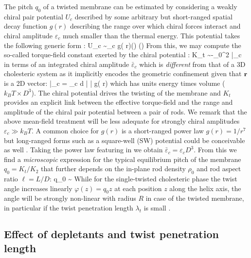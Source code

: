 The pitch $q_{0}$ of a twisted membrane can be estimated by considering a weakly chiral pair potential $U_{c}$ described by some arbitrary but short-ranged spatial decay function $g(r)$ describing the range over which chiral forces interact and chiral amplitude $\varepsilon_{c} $ much smaller than the thermal energy. This potential takes the following generic form \cite{goossens1971}:
\beq
U_{c} \sim  \varepsilon_{c} g( r)(\bwa \times \bwb \cdot   \bx) (\bwa \cdot \bwb)
\label{uchi}
\eeq
From this, we may compute the so-called torque-field constant exerted by the chiral potential \cite{wensink2018elastic}:
\beq
K_{t}   \sim -\rho_{0}^{2}  \bar{\varepsilon}_{c} 
\eeq
in terms of an integrated chiral amplitude  $\bar{\varepsilon}_{c}$ which is  {\em different} from that of a  3D cholesteric system as it implicitly encodes the geometric confinement given that ${\bf r}$ is a 2D vector:
\beq
 \bar{\varepsilon}_{c}  =  \varepsilon_{c} \int d \bdr | \bdr \cdot \bx |    g( r)
 \eeq
 which has units energy times volume ($k_{B}T \times D^{3}$). The chiral potential drives the twisting of the membrane and $K_{t}$  provides an explicit link between the effective torque-field and the range and amplitude  of the chiral pair potential between a pair of  rods. We remark that the above mean-field treatment will be less adequate for strongly chiral amplitudes $\varepsilon_{c} \gg k_{B}T$. A common choice for $g(r)$ is a short-ranged power law $g(r) = 1/r^{7}$ but  long-ranged forms such as a square-well (SW) potential could be conceivable as well \cite{wensinkjackson}. Taking the power law featuring in  we obtain $\bar{\varepsilon}_{c} = \varepsilon_{c} D^{3}$.  From this we find a {\em microscopic} expression for the typical equilibrium  pitch of the membrane $q_{0} = K_{t}/K_{2}$ that further depends on the in-plane rod density $\rho_{0}$ and rod aspect ratio $\ell = L/D$:
 \beq
 q_{0} \sim {}
 \label{qzero}
 \eeq
 While for the single-twisted cholesteric phase the twist angle increases linearly  $\varphi(z) = q_{0} z$ at each position $z$ along the helix axis, the angle will be strongly non-linear with radius $R$ in case of the twisted membrane, in particular if the twist penetration length $\lambda_{t}$ is small \cite{wensink2018elastic}.   
 


\subsection{Effect of depletants and twist penetration length}

